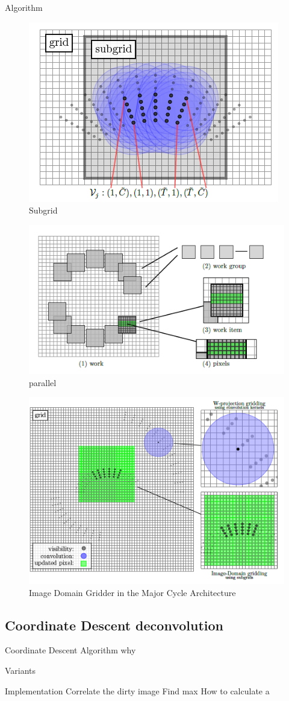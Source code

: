 Algorithm
\begin{figure}[h]
	\centering
	\includegraphics[width=0.40\linewidth]{./chapters/03.distribution/idg/subgrid.png}
	\caption{Subgrid}
	\label{distribution:idg:subgrid}
\end{figure}

\begin{figure}[h]
	\centering
	\includegraphics[width=0.40\linewidth]{./chapters/03.distribution/idg/paralellization.png}
	\caption{parallel}
	\label{distribution:idg:parallel}
\end{figure}

\begin{figure}[h]
	\centering
	\includegraphics[width=0.40\linewidth]{./chapters/03.distribution/idg/idg0.png}
	\caption{Image Domain Gridder in the Major Cycle Architecture}
	\label{distribution:idg:idg0}
\end{figure}

\subsection{Coordinate Descent deconvolution}

Coordinate Descent Algorithm why

Variants

Implementation
Correlate the dirty image
Find max
How to calculate a

